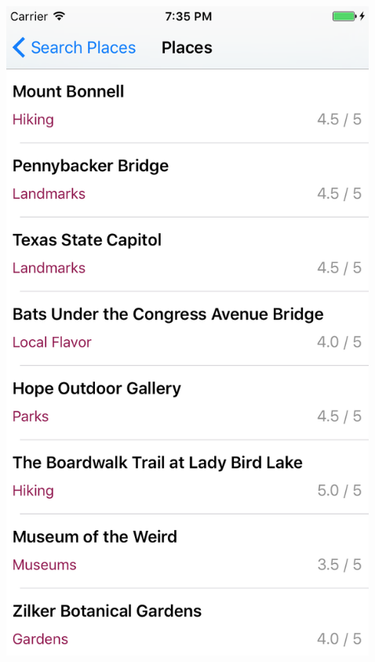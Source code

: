 \documentclass{beamer}
\begin{document}
\begin{frame}
\begin{columns}
\begin{column}{0.3\textwidth}
\begin{center}
        \end{center}
    \end{column}
    \begin{column}{0.3\textwidth}  %
        \begin{center}
            \includegraphics[scale=0.3]{placeTable}
        \end{center}
    \end{column}
    \begin{column}{0.3\textwidth}  %

\end{column}
\end{columns}
\end{frame}
\end{document}
